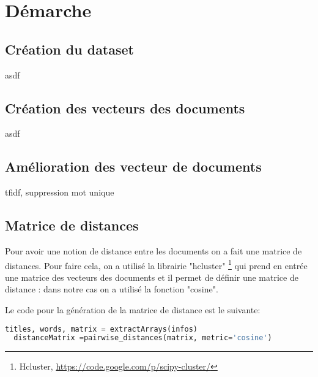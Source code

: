 \chapter{Démarche}
\section{Création du dataset}

asdf



\section{Création des vecteurs des documents}

asdf


\section{Amélioration des vecteur de documents}

tfidf, suppression mot unique



\section{Matrice de distances}

\label{matrice-distance}
Pour avoir une notion de distance entre les documents on a fait une matrice de distances. Pour faire cela, on a utilisé la librairie "hcluster" \footnote{Hcluster, \url{https://code.google.com/p/scipy-cluster/}} qui prend en entrée une matrice des vecteurs des documents et il permet de définir une matrice de distance : dans notre cas on a utilisé la fonction "cosine".

Le code pour la génération de la matrice de distance est le suivante:

\begin{lstlisting}[language=python]
  titles, words, matrix = extractArrays(infos)
  distanceMatrix =pairwise_distances(matrix, metric='cosine')
\end{lstlisting}


